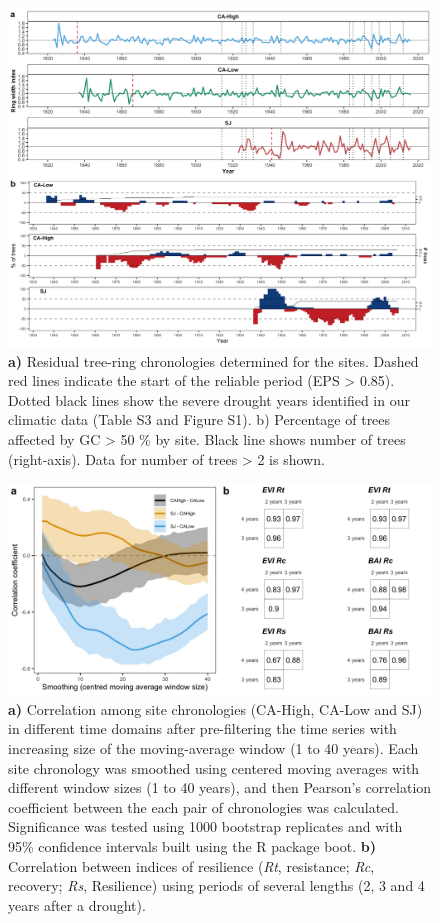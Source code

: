 \begin{figure}
\centering
\includegraphics[width=\textwidth]{img/dendro/dendro-s2chronos} 
\caption{\textbf{a)} Residual tree-ring chronologies determined for the \Qp sites. Dashed red lines indicate the start of the reliable period (EPS > 0.85). Dotted black lines show the severe drought years identified in our climatic data (Table S3 and Figure S1). b) Percentage of \Qp trees affected by GC > 50 \% by site. Black line shows number of trees (right-axis). Data for number of trees > 2 is shown.
}  
\label{fig:dendro:s2chronos}
\end{figure}

\newpage
\begin{figure}
\centering
\includegraphics[width=\textwidth]{img/dendro/dendro-s3correlation} 
\caption{\textbf{a)} Correlation among site chronologies (CA-High, CA-Low and SJ) in different time domains after pre-filtering the time series with increasing size of the moving-average window (1 to 40 years). Each site chronology was smoothed using centered moving averages with different window sizes (1 to 40 years), and then Pearson’s correlation coefficient between the each pair of chronologies was calculated. Significance was tested using 1000 bootstrap replicates and with 95\% confidence intervals built using the R package boot. \textbf{b)} Correlation between indices of resilience (\emph{Rt}, resistance; \emph{Rc}, recovery; \emph{Rs}, Resilience) using periods of several lengths (2, 3 and 4 years after a drought).}  
\label{fig:dendro:s3correlations}
\end{figure}

